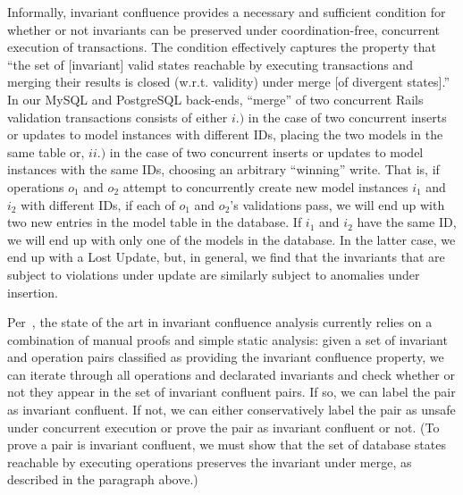  Informally, invariant confluence provides a
necessary and sufficient condition for whether or not invariants can
be preserved under coordination-free, concurrent execution of
transactions. The condition effectively captures the property that
``the set of [invariant] valid states reachable by executing
transactions and merging their results is closed (w.r.t. validity)
under merge [of divergent states].'' In our MySQL and PostgreSQL
back-ends, ``merge'' of two concurrent Rails validation transactions
consists of either $i.)$ in the case of two concurrent inserts or
updates to model instances with different IDs, placing the two models
in the same table or, $ii.)$ in the case of two concurrent inserts or
updates to model instances with the same IDs, choosing an arbitrary
``winning'' write. That is, if operations $o_1$ and $o_2$ attempt to
concurrently create new model instances $i_1$ and $i_2$ with different
IDs, if each of $o_1$ and $o_2$'s validations pass, we will end up
with two new entries in the model table in the database. If $i_1$ and
$i_2$ have the same ID, we will end up with only one of the models in
the database. In the latter case, we end up with a Lost Update, but,
in general, we find that the invariants that are subject to violations
under update are similarly subject to anomalies under insertion.

Per~\cite{coord-avoid}, the state of the art in invariant confluence
analysis currently relies on a combination of manual proofs and simple
static analysis: given a set of invariant and operation pairs
classified as providing the invariant confluence property, we can
iterate through all operations and declarated invariants and check
whether or not they appear in the set of invariant confluent pairs. If
so, we can label the pair as invariant confluent. If not, we can
either conservatively label the pair as unsafe under concurrent
execution or prove the pair as invariant confluent or not. (To prove a
pair is invariant confluent, we must show that the set of database
states reachable by executing operations preserves the invariant under
merge, as described in the paragraph above.)

